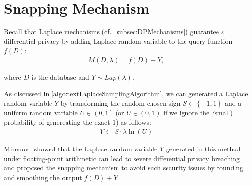 \section{Snapping Mechanism}
\label{sec:snappingMechanism}
Recall that Laplace mechanisms (cf.~\autoref{subsec:DPMechanisms}) guarantee $\varepsilon$ differential privacy by adding Laplace random variable to the query function $f\left(D\right)  $:
\begin{equation}
    \begin{split}
        M\left(D, \lambda\right)=f\left(D\right)+Y,
    \end{split}
\end{equation}

where $D$ is the database and $Y \sim Lap\left(\lambda\right) $.

As discussed in \autoref{algo:textLaplaceSamplingAlgorithm}, we can generated a Laplace random variable $Y$ by transforming the random chosen sign $S\in \left\{-1,1\right\} $ and a uniform random variable $U \in \left(0,1\right] $ (or $U \in \left(0,1\right) $ if we ignore the \textit(small) probability of genereating the exact $1$) as follows:
\begin{equation}
    \begin{split}
        Y \gets S \cdot \lambda \ln\left(U\right)
    \end{split}
\end{equation}


Mironov~\cite{mironov2012significance} showed that the Laplace random variable $Y$ generated in this method under floating-point arithmetic can lead to severe differential privacy breaching and proposed the snapping mechanism to avoid such security issues by rounding and smoothing the output $f\left(D\right)+Y$.


